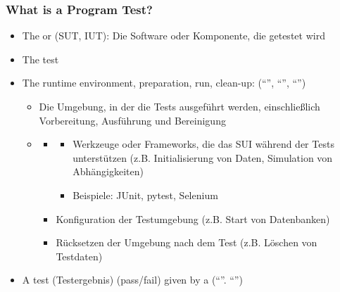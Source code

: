 \subsubsection*{What is a Program Test?}
\begin{defBox}[title=Constituents of a Program Test]
    \begin{itemize}
        \item The  or  (SUT, IUT): Die Software oder Komponente, die getestet wird
        \item The test 
        \item The runtime environment, preparation, run, clean-up:  (\enquote{}, \enquote{}, \enquote{})
        \begin{infoBox}[title=Die Laufzeitumgebung]
            \begin{itemize}
                \item {} Die Umgebung, in der die Tests ausgeführt werden, einschließlich Vorbereitung, Ausführung und Bereinigung
                \item {}
                \begin{itemize}
                    \item {}
                    \begin{itemize}
                        \item Werkzeuge oder Frameworks, die das SUI während der Tests unterstützen (z.B. Initialisierung von Daten, Simulation von Abhängigkeiten)
                        \item Beispiele: JUnit, pytest, Selenium
                    \end{itemize}
                    \item {} Konfiguration der Testumgebung (z.B. Start von Datenbanken)
                    \item {} Rücksetzen der Umgebung nach dem Test (z.B. Löschen von Testdaten)
                \end{itemize}
            \end{itemize}
        \end{infoBox}
        \item A test  (Testergebnis) (pass/fail) given by a  (\enquote{}. \enquote{})
    \end{itemize}
\end{defBox}
